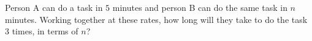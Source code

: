 Person A can do a task in $5$ minutes and person B can do the same task in $n$ minutes. Working together at these rates, how long will they take to do the task $3$ times, in terms of $n$?
